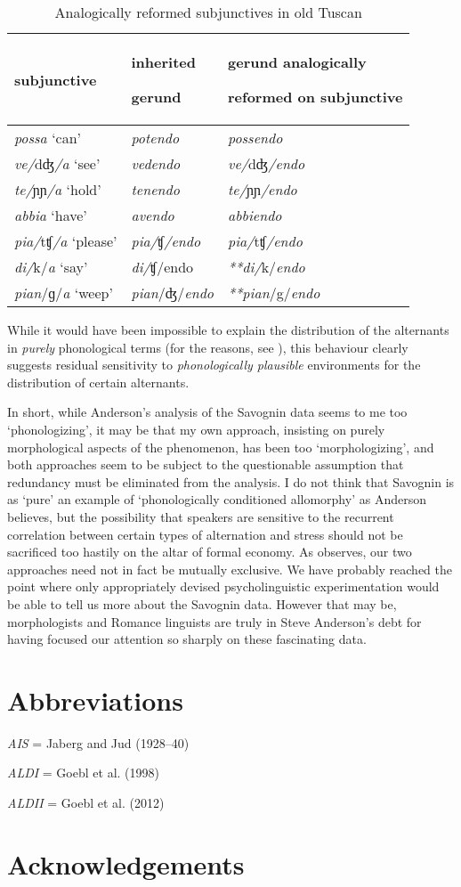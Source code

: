 \documentclass[output=paper,
modfonts
]{LSP/langsci}
\begin{document}
\begin{longtable}[]{@{}lll@{}}
\caption{Analogically reformed subjunctives in old Tuscan} \\
\lsptoprule
subjunctive & inherited

gerund & gerund analogically

reformed on subjunctive\tabularnewline
\midrule
\endhead
\emph{possa} `can' & \emph{potendo} & \emph{possendo}\tabularnewline
\emph{ve/}dʤ\emph{/a} `see' & \emph{vedendo} &
\emph{ve/}dʤ\emph{/endo}\tabularnewline
\emph{te/}ɲɲ\emph{/a} `hold' & \emph{tenendo} &
\emph{te/}ɲɲ\emph{/endo}\tabularnewline
\emph{abbia} `have' & \emph{avendo} & \emph{abbiendo}\tabularnewline
\emph{pia/}tʧ\emph{/a} `please' & \emph{pia/}ʧ\emph{/endo} &
\emph{pia/}tʧ\emph{/endo}\tabularnewline
\emph{di/}k/\emph{a} `say' & \emph{di/}ʧ/endo &
\emph{**di/}k/\emph{endo}\tabularnewline
\emph{pian}/ɡ/\emph{a} `weep' & \emph{pian}/ʤ/\emph{endo} &
\emph{**pian}/g/\emph{endo}\tabularnewline
\bottomrule
\end{longtable}

While it would have been impossible to explain the distribution of the
alternants in \emph{purely} phonological terms (for the reasons, see
\citealt[25--31]{maiden2013a}), this behaviour clearly suggests residual sensitivity
to \emph{phonologically plausible} environments for the distribution of
certain alternants.

In short, while Anderson's analysis of the Savognin data seems to me too
`phonologizing', it may be that my own approach, insisting on purely
morphological aspects of the phenomenon, has been too `morphologizing',
and both approaches seem to be subject to the questionable assumption
that redundancy must be eliminated from the analysis. I do not think
that Savognin is as `pure' an example of `phonologically conditioned
allomorphy' as Anderson believes, but the possibility that speakers are
sensitive to the recurrent correlation between certain types of
alternation and stress should not be sacrificed too hastily on the altar
of formal economy. As \citet[205f.]{Sims15:book} observes, our two approaches
need not in fact be mutually exclusive. We have probably reached the
point where only appropriately devised psycholinguistic experimentation
would be able to tell us more about the Savognin data. However that may
be, morphologists and Romance linguists are truly in Steve Anderson's
debt for having focused our attention so sharply on these fascinating
data.


\section*{Abbreviations}
\emph{AIS} = Jaberg and Jud (1928--40)

\emph{ALDI} = Goebl et al. (1998)

\emph{ALDII} = Goebl et al. (2012)

\section*{Acknowledgements}

\printbibliography[heading=subbibliography,notkeyword=this]

\end{document}
